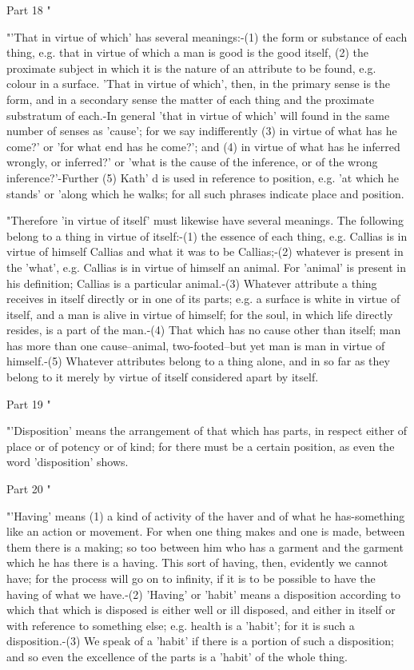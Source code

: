 Part 18 "

"'That in virtue of which' has several meanings:-(1) the form or substance
of each thing, e.g. that in virtue of which a man is good is the good
itself, (2) the proximate subject in which it is the nature of an
attribute to be found, e.g. colour in a surface. 'That in virtue of
which', then, in the primary sense is the form, and in a secondary
sense the matter of each thing and the proximate substratum of each.-In
general 'that in virtue of which' will found in the same number of
senses as 'cause'; for we say indifferently (3) in virtue of what
has he come?' or 'for what end has he come?'; and (4) in virtue of
what has he inferred wrongly, or inferred?' or 'what is the cause
of the inference, or of the wrong inference?'-Further (5) Kath' d
is used in reference to position, e.g. 'at which he stands' or 'along
which he walks; for all such phrases indicate place and position.

"Therefore 'in virtue of itself' must likewise have several meanings.
The following belong to a thing in virtue of itself:-(1) the essence
of each thing, e.g. Callias is in virtue of himself Callias and what
it was to be Callias;-(2) whatever is present in the 'what', e.g.
Callias is in virtue of himself an animal. For 'animal' is present
in his definition; Callias is a particular animal.-(3) Whatever attribute
a thing receives in itself directly or in one of its parts; e.g. a
surface is white in virtue of itself, and a man is alive in virtue
of himself; for the soul, in which life directly resides, is a part
of the man.-(4) That which has no cause other than itself; man has
more than one cause--animal, two-footed--but yet man is man in virtue
of himself.-(5) Whatever attributes belong to a thing alone, and in
so far as they belong to it merely by virtue of itself considered
apart by itself. 

Part 19 "

"'Disposition' means the arrangement of that which has parts, in respect
either of place or of potency or of kind; for there must be a certain
position, as even the word 'disposition' shows. 

Part 20 "

"'Having' means (1) a kind of activity of the haver and of what he
has-something like an action or movement. For when one thing makes
and one is made, between them there is a making; so too between him
who has a garment and the garment which he has there is a having.
This sort of having, then, evidently we cannot have; for the process
will go on to infinity, if it is to be possible to have the having
of what we have.-(2) 'Having' or 'habit' means a disposition according
to which that which is disposed is either well or ill disposed, and
either in itself or with reference to something else; e.g. health
is a 'habit'; for it is such a disposition.-(3) We speak of a 'habit'
if there is a portion of such a disposition; and so even the excellence
of the parts is a 'habit' of the whole thing. 


